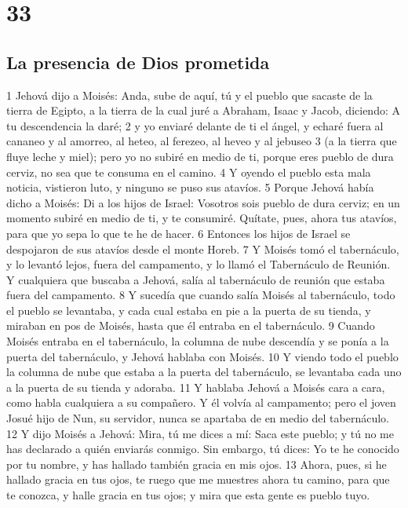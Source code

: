 \chapter{33}

\section{La presencia de Dios prometida}

1 Jehová dijo a Moisés: Anda, sube de aquí, tú y el pueblo que sacaste de la tierra de Egipto, a la tierra de la cual juré a Abraham, Isaac y Jacob, diciendo: A tu descendencia la daré;
2 y yo enviaré delante de ti el ángel, y echaré fuera al cananeo y al amorreo, al heteo, al ferezeo, al heveo y al jebuseo
3 (a la tierra que fluye leche y miel); pero yo no subiré en medio de ti, porque eres pueblo de dura cerviz, no sea que te consuma en el camino.
4 Y oyendo el pueblo esta mala noticia, vistieron luto, y ninguno se puso sus atavíos.
5 Porque Jehová había dicho a Moisés: Di a los hijos de Israel: Vosotros sois pueblo de dura cerviz; en un momento subiré en medio de ti, y te consumiré. Quítate, pues, ahora tus atavíos, para que yo sepa lo que te he de hacer.
6 Entonces los hijos de Israel se despojaron de sus atavíos desde el monte Horeb.
7 Y Moisés tomó el tabernáculo, y lo levantó lejos, fuera del campamento, y lo llamó el Tabernáculo de Reunión. Y cualquiera que buscaba a Jehová, salía al tabernáculo de reunión que estaba fuera del campamento.
8 Y sucedía que cuando salía Moisés al tabernáculo, todo el pueblo se levantaba, y cada cual estaba en pie a la puerta de su tienda, y miraban en pos de Moisés, hasta que él entraba en el tabernáculo.
9 Cuando Moisés entraba en el tabernáculo, la columna de nube descendía y se ponía a la puerta del tabernáculo, y Jehová hablaba con Moisés.
10 Y viendo todo el pueblo la columna de nube que estaba a la puerta del tabernáculo, se levantaba cada uno a la puerta de su tienda y adoraba.
11 Y hablaba Jehová a Moisés cara a cara, como habla cualquiera a su compañero. Y él volvía al campamento; pero el joven Josué hijo de Nun, su servidor, nunca se apartaba de en medio del tabernáculo.
12 Y dijo Moisés a Jehová: Mira, tú me dices a mí: Saca este pueblo; y tú no me has declarado a quién enviarás conmigo. Sin embargo, tú dices: Yo te he conocido por tu nombre, y has hallado también gracia en mis ojos.
13 Ahora, pues, si he hallado gracia en tus ojos, te ruego que me muestres ahora tu camino, para que te conozca, y halle gracia en tus ojos; y mira que esta gente es pueblo tuyo.
